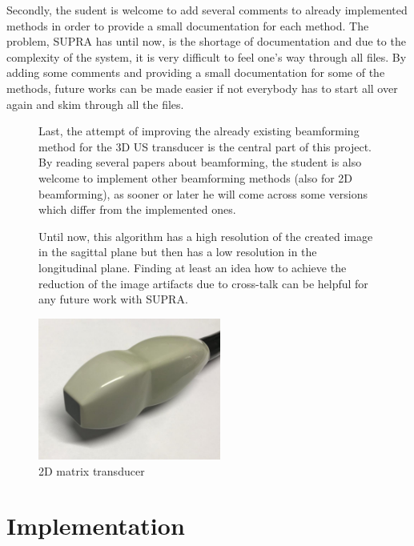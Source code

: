\documentclass[12pt,a4paper,oneside]{scrartcl}
\begin{document}
Secondly, the sudent is welcome to add several comments to already implemented methods in order to provide a small documentation for each method.
The problem, SUPRA has until now, is the shortage of documentation and due to the complexity of the system, it is very difficult to feel one's way through all files.
By adding some comments and providing a small documentation for some of the methods, future works can be made easier if not everybody has to start all over again and skim through all the files.



\begin{figure}[htbp]
\begin{minipage}[t]{0.6 \textwidth}
\vspace{0pt}
Last, the attempt of improving the already existing beamforming method for the 3D US transducer is the central part of this project.
By reading several papers about beamforming, the student is also welcome to implement other beamforming methods (also for 2D beamforming), as sooner or later he will come across some versions which differ from the implemented ones.

Until now, this algorithm has a high resolution of the created image in the sagittal plane but then has a low resolution in the longitudinal plane.
Finding at least an idea how to achieve the reduction of the image artifacts due to cross-talk can be helpful for any future work with SUPRA.
\end{minipage}
\begin{minipage}[t]{20mm}
\end{minipage}
\begin{minipage}[t]{6cm}
\vspace{0pt}
\centering
\includegraphics[width = 6cm]{Bilder/transducer.png}
\caption[Transducer]{2D matrix transducer}
\label{fig:transducer}
\end{minipage}
\end{figure}

\newpage
\section{Implementation}
\end{document}
